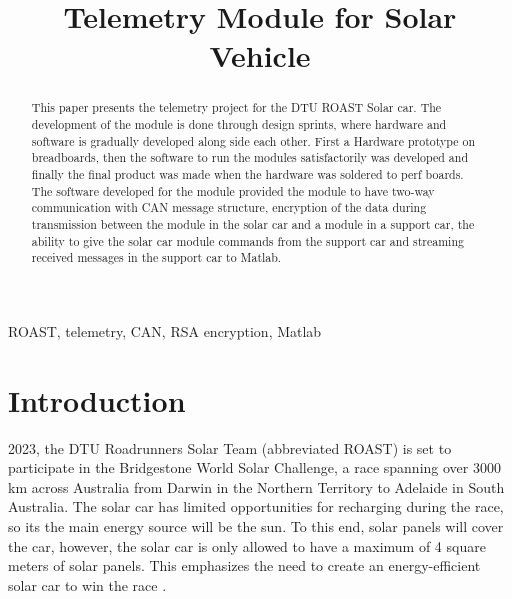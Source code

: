 \documentclass[conference]{IEEEtran}
\begin{document}
\title{Telemetry Module for Solar Vehicle}

\author{
}

\maketitle

\begin{abstract}
This paper presents the telemetry project for the DTU ROAST Solar car. The development of the module is done through design sprints, where hardware and software is gradually developed along side each other. First a Hardware prototype on breadboards, then the software to run the modules satisfactorily was developed and finally the final product was made when the hardware was soldered to perf boards.\\
The software developed for the module provided the module to have two-way communication with CAN message structure, encryption of the data during transmission between the module in the solar car and a module in a support car, the ability to give the solar car module commands from the support car and streaming received messages in the support car to Matlab.
\end{abstract}

\begin{IEEEkeywords}
ROAST, telemetry, CAN, RSA encryption, Matlab
\end{IEEEkeywords}



\section{Introduction}

 2023, the DTU Roadrunners Solar Team (abbreviated ROAST) is set to participate in the Bridgestone World Solar Challenge, a race spanning over 3000 km across Australia from Darwin in the Northern Territory to Adelaide in South Australia. The solar car has limited opportunities for recharging during the race, so its the main energy source will be the sun. To this end, solar panels will cover the car, however, the solar car is only allowed to have a maximum of 4 square meters of solar panels. This emphasizes the need to create an energy-efficient solar car to win the race \cite{wsc}.
\end{document}
